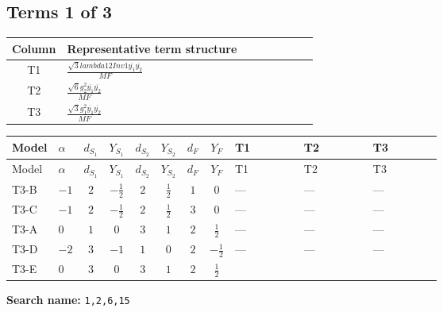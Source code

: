 \documentclass[8pt]{article}
\begin{document}
\begin{landscape}
\subsection*{Terms 1 of 3}
\begin{center}
\begin{tabular}{@{}c >{\raggedright\arraybackslash}p{0.82\linewidth}@{}}
\toprule
Column & Representative term structure \\
\midrule
T1 & \(\displaystyle \frac{\sqrt{3} lambda12Inv1 \overline{y_{1}} \overline{y_{2}}}{MF}\) \\
\midrule
T2 & \(\displaystyle \frac{\sqrt{6} g_{2}^{2} \overline{y_{1}} \overline{y_{2}}}{MF}\) \\
\midrule
T3 & \(\displaystyle \frac{\sqrt{3} g_{1}^{2} \overline{y_{1}} \overline{y_{2}}}{MF}\) \\
\midrule
\bottomrule
\end{tabular}
\end{center}
\smallskip
\tiny
\begin{longtable}{@{}llcccccc >{\raggedright\arraybackslash}p{0.21\linewidth} >{\raggedright\arraybackslash}p{0.21\linewidth} >{\raggedright\arraybackslash}p{0.21\linewidth}@{}}
\toprule
Model & $\alpha$ & $d_{S_1}$ & $Y_{S_1}$ & $d_{S_2}$ & $Y_{S_2}$ & $d_F$ & $Y_F$ & T1 & T2 & T3 \\
\midrule
\endfirsthead
\toprule
Model & $\alpha$ & $d_{S_1}$ & $Y_{S_1}$ & $d_{S_2}$ & $Y_{S_2}$ & $d_F$ & $Y_F$ & T1 & T2 & T3 \\
\midrule
\endhead
T3-B & $-1$ & $2$ & $-\frac{1}{2}$ & $2$ & $\frac{1}{2}$ & $1$ & $0$ & --- & --- & --- \\
\midrule
T3-C & $-1$ & $2$ & $-\frac{1}{2}$ & $2$ & $\frac{1}{2}$ & $3$ & $0$ & --- & --- & --- \\
\midrule
T3-A & $0$ & $1$ & $0$ & $3$ & $1$ & $2$ & $\frac{1}{2}$ & --- & --- & --- \\
\midrule
T3-D & $-2$ & $3$ & $-1$ & $1$ & $0$ & $2$ & $-\frac{1}{2}$ & --- & --- & --- \\
\midrule
T3-E & $0$ & $3$ & $0$ & $3$ & $1$ & $2$ & $\frac{1}{2}$ & \scriptsize\adjustbox{max width=\linewidth}{$\begin{gathered} - \frac{\sqrt{3} lambda12Inv1 \overline{y_{1}} \overline{y_{2}}}{6 MF}\end{gathered}$} & \scriptsize\adjustbox{max width=\linewidth}{$\begin{gathered} \frac{\sqrt{6} g_{2}^{2} \overline{y_{1}} \overline{y_{2}}}{6 MF}\end{gathered}$} & \scriptsize\adjustbox{max width=\linewidth}{$\begin{gathered} \frac{\sqrt{3} g_{1}^{2} \overline{y_{1}} \overline{y_{2}}}{8 MF}\end{gathered}$} \\
\midrule
\bottomrule
\end{longtable}
\clearpage
\noindent\textbf{Search name: }\texttt{1,2,6,15}\par\smallskip

\end{landscape}
\end{document}
